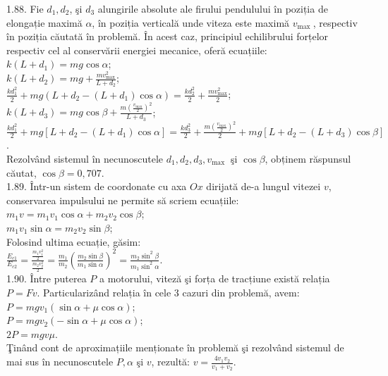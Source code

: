 1.88. Fie $d_{1}, d_{2}$, şi $d_{3}$ alungirile absolute ale firului pendulului în poziția de elongație maximă $\alpha$, în poziția verticală unde viteza este maximă $v_{\text {max }}$, respectiv în poziția căutată în problemă. În acest caz, principiul echilibrului forțelor respectiv cel al conservării energiei mecanice, oferă ecuațiile:\\ $k\left(L+d_{1}\right)=m g \cos \alpha$;\\ $k\left(L+d_{2}\right)=m g+\frac{m v_{\max }^{2}}{L+d_{2}}$;\\ $\frac{k d_{1}^{2}}{2}+m g\left(L+d_{2}-\left(L+d_{1}\right) \cos \alpha\right)=\frac{k d_{2}^{2}}{2}+\frac{m v_{\max }^{2}}{2}$;\\ $k\left(L+d_{3}\right)=m g \cos \beta+\frac{m\left(\frac{v_{\max }}{2}\right)^{2}}{L+d_{3}}$;\\ $\frac{k d_{1}^{2}}{2}+m g\left[L+d_{2}-\left(L+d_{1}\right) \cos \alpha\right]=\frac{k d_{3}^{2}}{2}+\frac{m\left(\frac{v_{\max }}{2}\right)^{2}}{2}+m g\left[L+d_{2}-\left(L+d_{3}\right) \cos \beta\right]$.\\ Rezolvând sistemul în necunoscutele $d_{1}, d_{2}, d_{3}, v_{\text {max }}$ şi $\cos \beta$, obținem răspunsul căutat, $\cos \beta=0,707$.\\

1.89. Într-un sistem de coordonate cu axa $O x$ dirijată de-a lungul vitezei $v$, conservarea impulsului ne permite să scriem ecuațiile:\\ $m_{1} v=m_{1} v_{1} \cos \alpha+m_{2} v_{2} \cos \beta$;\\ $m_{1} v_{1} \sin \alpha=m_{2} v_{2} \sin \beta$;\\ Folosind ultima ecuație, găsim:\\ $\frac{E_{c 1}}{E_{c 2}}=\frac{\frac{m_{1} v_{1}^{2}}{2}}{\frac{m_{2} v_{2}^{2}}{2}}=\frac{m_{1}}{m_{2}}\left(\frac{m_{2} \sin \beta}{m_{1} \sin \alpha}\right)^{2}=\frac{m_{2} \sin ^{2} \beta}{m_{1} \sin ^{2} \alpha}$.\\

1.90. Între puterea $P$ a motorului, viteză şi forța de tracțiune există relația $P=F v$. Particularizând relația în cele 3 cazuri din problemă, avem:\\ $P=m g v_{1}(\sin \alpha+\mu \cos \alpha)$;\\ $P=m g v_{2}(-\sin \alpha+\mu \cos \alpha)$;\\ $2 P=m g v \mu$.\\ Ţinând cont de aproximațiile menționate în problemă şi rezolvând sistemul de mai sus în necunoscutele $P, \alpha$ şi $v$, rezultă: $v=\frac{4 v_{1} v_{2}}{v_{1}+v_{2}}$.\\

